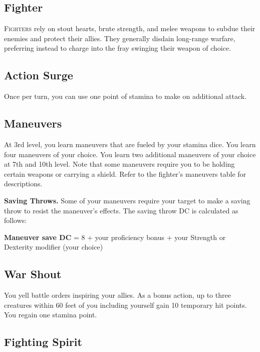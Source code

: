 
\begin{multicols*}{2}

\section{Fighter}

\lettrine[lines=3, lhang=0.15, loversize=0.25, findent=.5em]{F}{ighters} rely on stout hearts, brute strength, and melee weapons to subdue their enemies and protect their allies. They generally disdain long-range warfare, preferring instead to charge into the fray swinging their weapon of choice. 

\subsection*{Action Surge}

Once per turn, you can use one point of stamina to make on additional attack.



\subsection*{Maneuvers}

At 3rd level, you learn maneuvers that are fueled by your stamina dice.
You learn four maneuvers of your choice. You learn two additional maneuvers of your choice at 7th and 10th level. Note that some maneuvers require you to be holding certain weapons or carrying a shield. Refer to the  fighter's maneuvers table for descriptions.

\textbf{Saving Throws.} Some of your maneuvers require your target to make a saving throw to resist the maneuver's effects. The saving throw DC is calculated as follows:

\textbf{Maneuver save DC} = 8 + your proficiency bonus + your Strength or Dexterity modifier (your choice)


\subsection*{War Shout}

You yell battle orders inspiring your allies. 
As a bonus action, up to three creatures within 60 feet of you including yourself gain 10 temporary hit points.
You regain one stamina point.

\subsection*{Fighting Spirit}


\end{multicols*}
